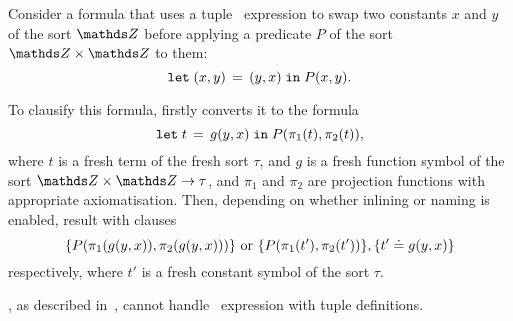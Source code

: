 \begin{example} Consider a formula that uses a tuple \LETIN\ expression to swap two constants $x$ and $y$ of the sort $\Z$ before applying a predicate $P$ of the sort $\Z \times \Z$ to them:
\begin{equation*}\label{eq:tuple-let-example}
  \mathtt{let}\;{(x,y)}\,=\,{(y,x)}\;\allowbreak\mathtt{in}\;{P(x,y)}.
\end{equation*}

To clausify this formula, \nfcnf{} firstly converts it to the formula $$\mathtt{let}\;{t}\,=\,{g(y,x)}\;\allowbreak\mathtt{in}\;{P(\pi_1(t), \pi_2(t))},$$ where $t$ is a fresh term of the fresh sort $\tau$, and $g$ is a fresh function symbol of the sort $\Z \times \Z \to \tau$, and $\pi_1$ and $\pi_2$ are projection functions with appropriate axiomatisation. Then, depending on whether inlining or naming is enabled, \nfcnf{} result with clauses $$\{P(\pi_1(g(y,x)),\pi_2(g(y,x)))\} \text{~or~} \{P(\pi_1(t'),\pi_2(t'))\}, \{t' \doteq g(y,x)\}$$ respectively, where $t'$ is a fresh constant symbol of the sort $\tau$.
\QED\end{example}

\oldcnf{}, as described in~\cite{FOOL}, cannot handle \LETIN\ expression with tuple definitions.